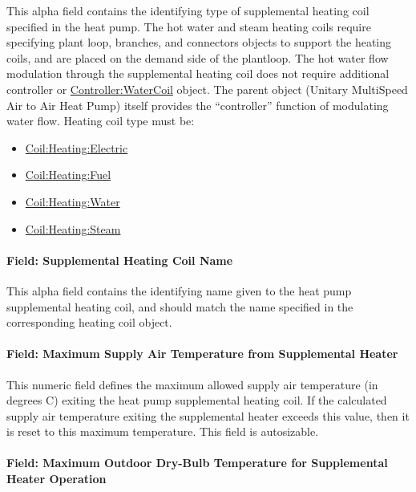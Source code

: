 This alpha field contains the identifying type of supplemental heating coil specified in the heat pump. The hot water and steam heating coils require specifying plant loop, branches, and connectors objects to support the heating coils, and are placed on the demand side of the plantloop. The hot water flow modulation through the supplemental heating coil does not require additional controller or \hyperref[controllerwatercoil]{Controller:WaterCoil} object. The parent object (Unitary MultiSpeed Air to Air Heat Pump) itself provides the ``controller'' function of modulating water flow. Heating coil type must be:

\begin{itemize}
\item
  \hyperref[coilheatingelectric]{Coil:Heating:Electric}
\item
  \hyperref[coilheatinggas-000]{Coil:Heating:Fuel}
\item
  \hyperref[coilheatingwater]{Coil:Heating:Water}
\item
  \hyperref[coilheatingsteam]{Coil:Heating:Steam}
\end{itemize}

\paragraph{Field: Supplemental Heating Coil Name}\label{field-supplemental-heating-coil-name-2}

This alpha field contains the identifying name given to the heat pump supplemental heating coil, and should match the name specified in the corresponding heating coil object.

\paragraph{Field: Maximum Supply Air Temperature from Supplemental Heater}\label{field-maximum-supply-air-temperature-from-supplemental-heater-1}

This numeric field defines the maximum allowed supply air temperature (in degrees C) exiting the heat pump supplemental heating coil. If the calculated supply air temperature exiting the supplemental heater exceeds this value, then it is reset to this maximum temperature. This field is autosizable.

\paragraph{Field: Maximum Outdoor Dry-Bulb Temperature for Supplemental Heater Operation}\label{field-maximum-outdoor-dry-bulb-temperature-for-supplemental-heater-operation-2}

